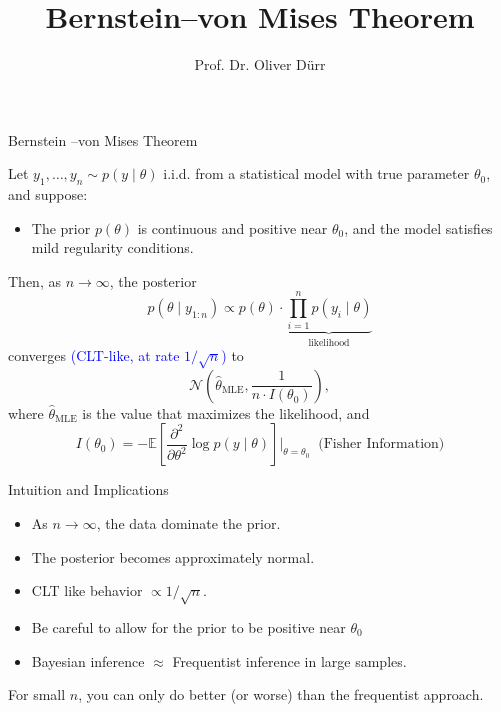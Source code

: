 \documentclass{beamer}
\title{Bernstein--von Mises Theorem}
\author{Prof. Dr. Oliver Dürr}
\institute{HTWG Konstanz -- Bayesian Data Analysis (VI)}
\date{}
\begin{document}
\begin{frame}
  \titlepage
\end{frame}

\begin{frame}{Bernstein --von Mises Theorem}

Let \( y_1, \dots, y_n \sim p(y \mid \theta) \) i.i.d. from a statistical model with true parameter \( \theta_0 \), and suppose:
\begin{itemize}
  \item The prior \( p(\theta) \) is continuous and \alert{positive} near \( \theta_0 \), and the model satisfies mild regularity conditions.
\end{itemize}

\vspace{.25em}

Then, as \( n \to \infty \), the posterior
\[
p(\theta \mid y_{1:n}) \propto p(\theta) \cdot \underbrace{\prod_{i=1}^n p(y_i \mid \theta)}_{\text{likelihood}}
\]
converges \textcolor{blue}{(CLT-like, at rate \(1/\sqrt{n}\))} to
\[
\mathcal{N}\left(\hat{\theta}_{\text{MLE}}, \frac{1}{n \cdot I(\theta_0)} \right),
\]
where \( \hat{\theta}_{\text{MLE}} \) is the value that maximizes the likelihood, and
\[
I(\theta_0) = - \mathbb{E}\left[ \frac{\partial^2}{\partial \theta^2} \log p(y \mid \theta) \right] \Bigg|_{\theta = \theta_0}
\;\; \text{(Fisher Information)}
\]


\end{frame}


\begin{frame}{Intuition and Implications}
\vspace{-0.5em}
\begin{itemize}
  \item As \( n \to \infty \), the data dominate the prior.
  \item The posterior becomes approximately normal.
  \item CLT like behavior $\propto 1/\sqrt{n}$. 
  \item Be careful to allow for the prior to be positive near \( \theta_0 \)
  \item Bayesian inference $\approx$ Frequentist inference in large samples.
\end{itemize}
\vspace{1em}
For small \( n \), you can only do better (or worse) than the frequentist approach. 
\end{frame}

\end{document}
